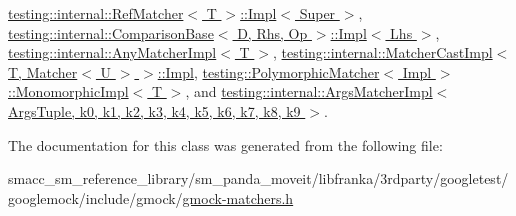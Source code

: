 \hyperlink{classtesting_1_1internal_1_1RefMatcher_3_01T_01_6_01_4_1_1Impl_a3ddb19a24bfbb627a9c6194b665cbd19}{testing\+::internal\+::\+Ref\+Matcher$<$ T $>$\+::\+Impl$<$ Super $>$}, \hyperlink{classtesting_1_1internal_1_1ComparisonBase_1_1Impl_a224bdd8f8196208d8138668dc74e1d27}{testing\+::internal\+::\+Comparison\+Base$<$ D, Rhs, Op $>$\+::\+Impl$<$ Lhs $>$}, \hyperlink{classtesting_1_1internal_1_1AnyMatcherImpl_a743f037083cc9992a4cc0d4e9842bc86}{testing\+::internal\+::\+Any\+Matcher\+Impl$<$ T $>$}, \hyperlink{classtesting_1_1internal_1_1MatcherCastImpl_3_01T_00_01Matcher_3_01U_01_4_01_4_1_1Impl_a42677b4e3e3d7b9c8610e33c399f9154}{testing\+::internal\+::\+Matcher\+Cast\+Impl$<$ T, Matcher$<$ U $>$ $>$\+::\+Impl}, \hyperlink{classtesting_1_1PolymorphicMatcher_1_1MonomorphicImpl_aa98a5eecc47f87bc297231a88714e33e}{testing\+::\+Polymorphic\+Matcher$<$ Impl $>$\+::\+Monomorphic\+Impl$<$ T $>$}, and \hyperlink{classtesting_1_1internal_1_1ArgsMatcherImpl_a8e057f67b368f7d94aeb0ddd35837c94}{testing\+::internal\+::\+Args\+Matcher\+Impl$<$ Args\+Tuple, k0, k1, k2, k3, k4, k5, k6, k7, k8, k9 $>$}.



The documentation for this class was generated from the following file\+:\begin{DoxyCompactItemize}
\item 
smacc\+\_\+sm\+\_\+reference\+\_\+library/sm\+\_\+panda\+\_\+moveit/libfranka/3rdparty/googletest/googlemock/include/gmock/\hyperlink{gmock-matchers_8h}{gmock-\/matchers.\+h}\end{DoxyCompactItemize}
